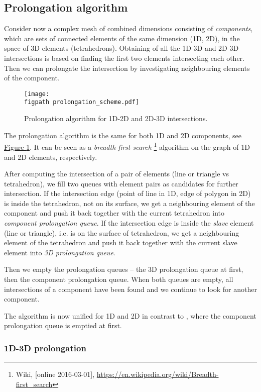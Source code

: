 \documentclass{elsarticle}
\newcommand{\fig}[1]{\hyperref[#1]{Figure \ref{#1}}}
\newcommand{\figpath}{figures/}
\begin{document}
\subsection{Prolongation algorithm}
Consider now a complex mesh of combined dimensions consisting of \emph{components}, which are sets of connected
elements of the same dimension (1D, 2D), in the space of 3D elements (tetrahedrons). 
Obtaining of all the 1D-3D and 2D-3D intersections is based on finding the first two elements intersecting each other.
Then we can prolongate the intersection by investigating neighbouring elements of the component.
%
\begin{figure}[!htb]
  \centering    
    \texttt{[image: \\figpath prolongation\_scheme.pdf]}
  \caption{Prolongation algorithm for 1D-2D and 2D-3D intersections. }
  \label{fig:prolongation}
\end{figure}

The prolongation algorithm is the same for both 1D and 2D components, see \fig{fig:prolongation}. 
It can be seen as a \emph{breadth-first search}
\footnote{Wiki, [online 2016-03-01], \url{https://en.wikipedia.org/wiki/Breadth-first_search}}
algorithm on the graph of 1D and 2D elements, respectively.

After computing the intersection of a pair of elements (line or triangle vs tetrahedron), we fill
two queues with element pairs as candidates for further intersection. If the intersection edge 
(point of line in 1D, edge of polygon in 2D) is inside the tetrahedron, not on its surface, we
get a neighbouring element of the component and push it back together with the current tetrahedron into 
\emph{component prolongation queue}. If the intersection edge is inside the \emph{slave} element 
(line or triangle), i.e. is on the surface of tetrahedron, we get a neighbouring element of the tetrahedron
and push it back together with the current slave element into \emph{3D prolongation queue}.

Then we empty the prolongation queues -- the 3D prolongation queue at first, then the component prolongation queue.
When both queues are empty, all intersections of a component have been found and we continue to look for
another component.

The algorithm is now unified for 1D and 2D in contrast to \cite{fris_dp_2015}, where the component prolongation
queue is emptied at first.

\subsubsection{1D-3D prolongation}
\end{document}
